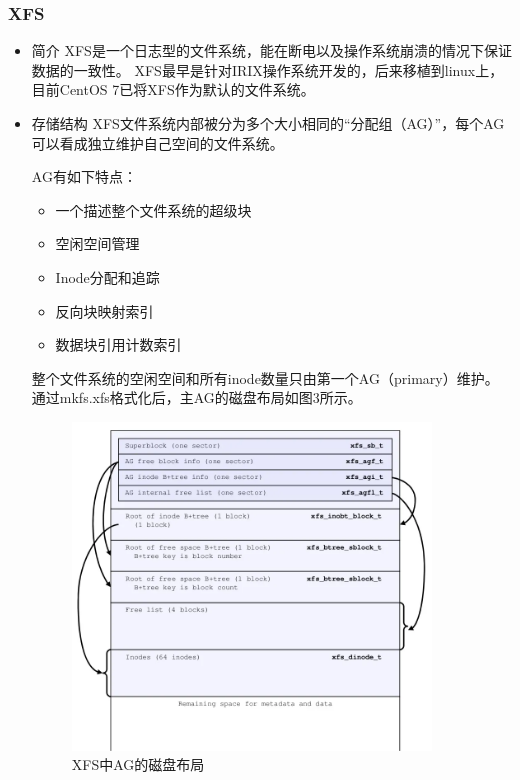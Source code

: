 \documentclass[UTF8,a4paper]{ctexart}
\begin{document}
\subsubsection{XFS}
\begin{itemize}
\item 简介
XFS是一个日志型的文件系统，能在断电以及操作系统崩溃的情况下保证数据的一致性。
XFS最早是针对IRIX操作系统开发的，后来移植到linux上，目前CentOS 7已将XFS作为默认的文件系统。
\item 存储结构
XFS文件系统内部被分为多个大小相同的“分配组（AG）”，每个AG可以看成独立维护自己空间的文件系统。

AG有如下特点：
	\begin{itemize}
	\item 一个描述整个文件系统的超级块
	\item 空闲空间管理
	\item Inode分配和追踪
	\item 反向块映射索引
	\item 数据块引用计数索引
	\end{itemize}
整个文件系统的空闲空间和所有inode数量只由第一个AG（primary）维护。通过mkfs.xfs格式化后，主AG的磁盘布局如图3所示。
	\begin{figure}[htb]
		\centering
		\includegraphics[width=0.9\textwidth]{XFS.png}
		\caption{XFS中AG的磁盘布局}
	\end{figure}
\end{itemize}
\end{document}
